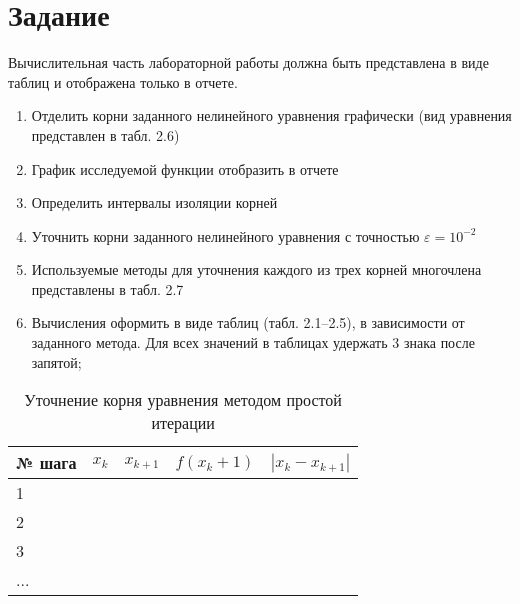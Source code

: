 \documentclass{article}
\begin{document}
\itmo[
      variant=13,
      labn=2,
      discipline=Вычислительная математика,
      group=P3212,
      student=Соколов Анатолий Владимирович,
      teacher=Наумова Надежда Александровна 
]
\lstset{language=rust}
\tableofcontents

\section{Задание}
      Вычислительная часть лабораторной работы должна быть представлена в виде таблиц и отображена только в отчете.
      \begin{enumerate}
            \item Отделить корни заданного нелинейного уравнения графически (вид уравнения представлен в табл. 2.6)
            \item График исследуемой функции отобразить в отчете
            \item Определить интервалы изоляции корней
            \item Уточнить корни заданного нелинейного уравнения с точностью $\varepsilon=10^{-2}$
            \item Используемые методы для уточнения каждого из трех корней многочлена представлены в табл. 2.7
            \item Вычисления оформить в виде таблиц (табл. 2.1–2.5), в зависимости от заданного метода. Для всех значений в таблицах удержать 3 знака после запятой;
      \end{enumerate}
      \begin{table}[h!]
            \centering
            \begin{tabular}{|l|l|l|l|l|}
            \hline
            \textbf{№ шага} & $x_k$ & $x_{k+1}$ & $f(x_k+1)$ & $|x_k - x_{k+1}|$ \\ \hline
            1 & & & &                \\ \hline
            2 & & & &                \\ \hline
            3 & & & &                \\ \hline
            ... & & & &                \\ \hline
            \end{tabular}
            \caption{Уточнение корня уравнения методом простой итерации}
            \label{table:functional_requirements}
        \end{table}
\end{document}
